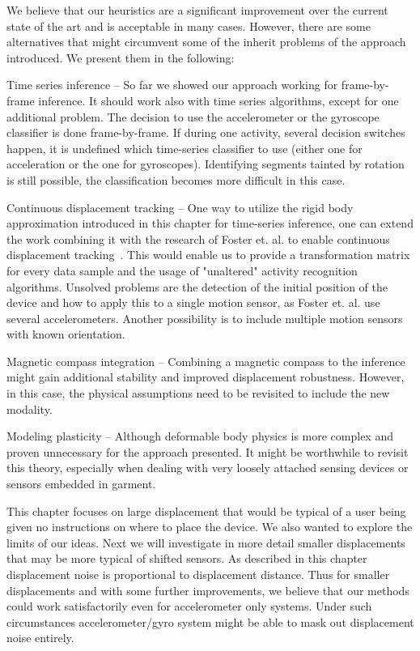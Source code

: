 We believe that our heuristics are a
significant improvement over the current state of the art
and is acceptable in many cases. However, there are some 
alternatives that might circumvent some of the inherit problems
of the approach introduced. We present them in the following: 

\begin{description}
  \item{Time series inference} -- So far we showed our approach 
working for frame-by-frame inference. It should work also with time series
algorithms, except for one additional problem. The decision to use the accelerometer
or the gyroscope classifier is done frame-by-frame. If during one activity,
several decision switches happen, it is undefined which time-series classifier to use 
(either one for acceleration or the one for gyroscopes). Identifying
segments tainted by rotation is still possible, the classification becomes more difficult
in this case.
  \item{Continuous displacement tracking} -- One way to utilize the rigid body approximation
introduced in this chapter for time-series inference, one can extend the work combining it
with the research of Foster et. al. to enable continuous displacement tracking~\cite{Forster1,Forster2}.
This would enable us to provide a transformation matrix for every data sample
and the usage of "unaltered" activity recognition algorithms.
Unsolved problems are the detection of the initial position of the device and how
to apply this to a single motion sensor, as Foster et. al. use several accelerometers. Another 
possibility is to include multiple motion sensors with known orientation.
  \item{Magnetic compass integration} -- Combining a magnetic compass to the inference 
might gain additional stability and improved displacement robustness. However, in this case,
the physical assumptions need to be revisited to include the new modality.
  \item{Modeling plasticity} -- Although deformable body physics is more complex
and proven unnecessary for the approach presented. It might be worthwhile to revisit
this theory, especially when dealing with very loosely attached sensing devices or sensors
embedded in garment.
\end{description}

This chapter focuses on large displacement that would be typical of
a user being given no instructions on where to place the device.  We
also wanted to explore the limits of our ideas. Next
we will investigate in more detail smaller displacements that may be
more typical of shifted sensors. As described in this chapter displacement noise is
proportional to displacement distance. Thus for smaller displacements
and with some further improvements, we believe that our methods could
work satisfactorily even for accelerometer only systems. Under such
circumstances accelerometer/gyro system might  be able to mask out
displacement noise entirely.



